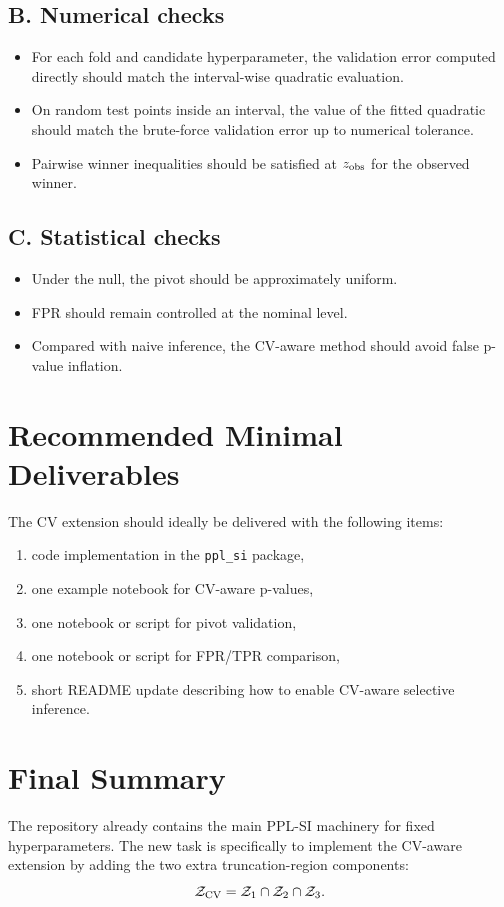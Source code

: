 \documentclass[11pt]{article}
\begin{document}
\subsection*{B. Numerical checks}
\begin{itemize}[leftmargin=2em]
    \item For each fold and candidate hyperparameter, the validation error computed directly should match the interval-wise quadratic evaluation.
    \item On random test points inside an interval, the value of the fitted quadratic should match the brute-force validation error up to numerical tolerance.
    \item Pairwise winner inequalities should be satisfied at $z_{\rm obs}$ for the observed winner.
\end{itemize}

\subsection*{C. Statistical checks}
\begin{itemize}[leftmargin=2em]
    \item Under the null, the pivot should be approximately uniform.
    \item FPR should remain controlled at the nominal level.
    \item Compared with naive inference, the CV-aware method should avoid false p-value inflation.
\end{itemize}

\section{Recommended Minimal Deliverables}
The CV extension should ideally be delivered with the following items:
\begin{enumerate}[leftmargin=2em]
    \item code implementation in the \texttt{ppl\_si} package,
    \item one example notebook for CV-aware p-values,
    \item one notebook or script for pivot validation,
    \item one notebook or script for FPR/TPR comparison,
    \item short README update describing how to enable CV-aware selective inference.
\end{enumerate}

\section{Final Summary}
The repository already contains the main PPL-SI machinery for fixed hyperparameters. The new task is specifically to implement the CV-aware extension by adding the two extra truncation-region components:
\[
\mathcal{Z}_{\rm CV} = \mathcal{Z}_1 \cap \mathcal{Z}_2 \cap \mathcal{Z}_3.
\]
\end{document}
